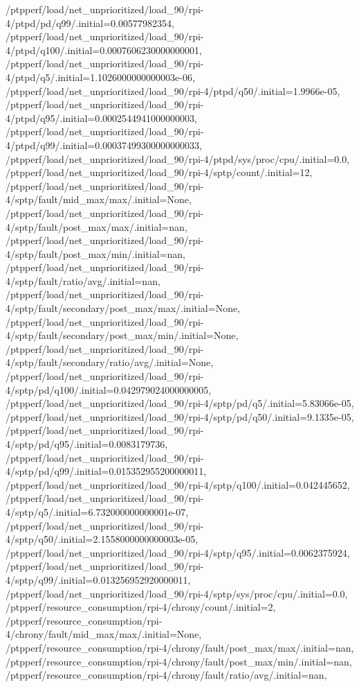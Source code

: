 {    /ptpperf/load/net_unprioritized/load_90/rpi-4/ptpd/pd/q99/.initial=0.00577982354,
    /ptpperf/load/net_unprioritized/load_90/rpi-4/ptpd/q100/.initial=0.0007606230000000001,
    /ptpperf/load/net_unprioritized/load_90/rpi-4/ptpd/q5/.initial=1.1026000000000003e-06,
    /ptpperf/load/net_unprioritized/load_90/rpi-4/ptpd/q50/.initial=1.9966e-05,
    /ptpperf/load/net_unprioritized/load_90/rpi-4/ptpd/q95/.initial=0.0002544941000000003,
    /ptpperf/load/net_unprioritized/load_90/rpi-4/ptpd/q99/.initial=0.00037499300000000033,
    /ptpperf/load/net_unprioritized/load_90/rpi-4/ptpd/sys/proc/cpu/.initial=0.0,
    /ptpperf/load/net_unprioritized/load_90/rpi-4/sptp/count/.initial=12,
    /ptpperf/load/net_unprioritized/load_90/rpi-4/sptp/fault/mid_max/max/.initial=None,
    /ptpperf/load/net_unprioritized/load_90/rpi-4/sptp/fault/post_max/max/.initial=nan,
    /ptpperf/load/net_unprioritized/load_90/rpi-4/sptp/fault/post_max/min/.initial=nan,
    /ptpperf/load/net_unprioritized/load_90/rpi-4/sptp/fault/ratio/avg/.initial=nan,
    /ptpperf/load/net_unprioritized/load_90/rpi-4/sptp/fault/secondary/post_max/max/.initial=None,
    /ptpperf/load/net_unprioritized/load_90/rpi-4/sptp/fault/secondary/post_max/min/.initial=None,
    /ptpperf/load/net_unprioritized/load_90/rpi-4/sptp/fault/secondary/ratio/avg/.initial=None,
    /ptpperf/load/net_unprioritized/load_90/rpi-4/sptp/pd/q100/.initial=0.042979024000000005,
    /ptpperf/load/net_unprioritized/load_90/rpi-4/sptp/pd/q5/.initial=5.83066e-05,
    /ptpperf/load/net_unprioritized/load_90/rpi-4/sptp/pd/q50/.initial=9.1335e-05,
    /ptpperf/load/net_unprioritized/load_90/rpi-4/sptp/pd/q95/.initial=0.0083179736,
    /ptpperf/load/net_unprioritized/load_90/rpi-4/sptp/pd/q99/.initial=0.015352955200000011,
    /ptpperf/load/net_unprioritized/load_90/rpi-4/sptp/q100/.initial=0.042445652,
    /ptpperf/load/net_unprioritized/load_90/rpi-4/sptp/q5/.initial=6.732000000000001e-07,
    /ptpperf/load/net_unprioritized/load_90/rpi-4/sptp/q50/.initial=2.1558000000000003e-05,
    /ptpperf/load/net_unprioritized/load_90/rpi-4/sptp/q95/.initial=0.0062375924,
    /ptpperf/load/net_unprioritized/load_90/rpi-4/sptp/q99/.initial=0.013256952920000011,
    /ptpperf/load/net_unprioritized/load_90/rpi-4/sptp/sys/proc/cpu/.initial=0.0,
    /ptpperf/resource_consumption/rpi-4/chrony/count/.initial=2,
    /ptpperf/resource_consumption/rpi-4/chrony/fault/mid_max/max/.initial=None,
    /ptpperf/resource_consumption/rpi-4/chrony/fault/post_max/max/.initial=nan,
    /ptpperf/resource_consumption/rpi-4/chrony/fault/post_max/min/.initial=nan,
    /ptpperf/resource_consumption/rpi-4/chrony/fault/ratio/avg/.initial=nan,
}
